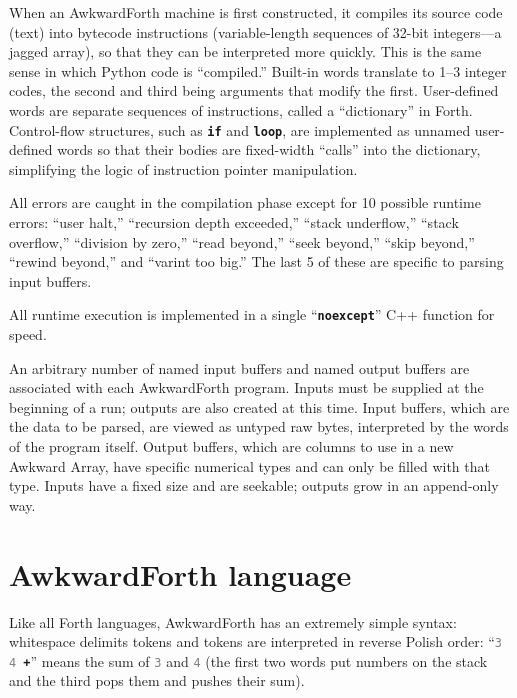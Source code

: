 \documentclass{webofc}
\begin{document}
When an AwkwardForth machine is first constructed, it compiles its source code (text) into bytecode instructions (variable-length sequences of 32-bit integers---a jagged array), so that they can be interpreted more quickly. This is the same sense in which Python code is ``compiled.'' Built-in words translate to 1--3 integer codes, the second and third being arguments that modify the first. User-defined words are separate sequences of instructions, called a ``dictionary'' in Forth. Control-flow structures, such as \textcolor{OliveGreen}{\tt\textbf{if}} and \textcolor{OliveGreen}{\tt\textbf{loop}}, are implemented as unnamed user-defined words so that their bodies are fixed-width ``calls'' into the dictionary, simplifying the logic of instruction pointer manipulation.

All errors are caught in the compilation phase except for 10 possible runtime errors: ``user halt,'' ``recursion depth exceeded,'' ``stack underflow,'' ``stack overflow,'' ``division by zero,'' ``read beyond,'' ``seek beyond,'' ``skip beyond,'' ``rewind beyond,'' and ``varint too big.'' The last 5 of these are specific to parsing input buffers.

All runtime execution is implemented in a single ``\textcolor{OliveGreen}{\tt\textbf{noexcept}}'' C++ function for speed.

An arbitrary number of named input buffers and named output buffers are associated with each AwkwardForth program. Inputs must be supplied at the beginning of a run; outputs are also created at this time. Input buffers, which are the data to be parsed, are viewed as untyped raw bytes, interpreted by the words of the program itself. Output buffers, which are columns to use in a new Awkward Array, have specific numerical types and can only be filled with that type. Inputs have a fixed size and are seekable; outputs grow in an append-only way.

\section{AwkwardForth language}

Like all Forth languages, AwkwardForth has an extremely simple syntax: whitespace delimits tokens and tokens are interpreted in reverse Polish order: ``{\tt\textcolor{gray}{3} \textcolor{gray}{4} \textcolor{OliveGreen}{\textbf{+}}}'' means the sum of \textcolor{gray}{\tt 3} and \textcolor{gray}{\tt 4} (the first two words put numbers on the stack and the third pops them and pushes their sum).
\end{document}
